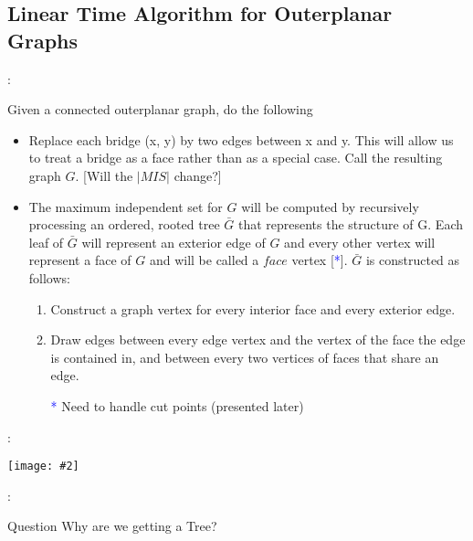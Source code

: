 \documentclass{beamer}
\newcommand{\iph}[2]{
    \texttt{[image: \#2]}
}
\begin{document}
\subsection{Linear Time Algorithm for Outerplanar Graphs}
\begin{frame}{\secname : \subsecname}
    \begin{block}{Given a connected outerplanar graph, do the following}
    \begin{itemize}
        \item Replace each bridge (x, y) by two
        edges between x and y. This will allow us to treat a bridge as a face rather
        than as a special case. Call the resulting graph $G$. [Will the $|MIS|$ change?]

        \item The maximum independent set for $G$ will be computed by recursively
processing an ordered, rooted tree $\bar{G}$ that represents the structure of G. Each
leaf of $\bar{G}$ will represent an exterior edge of $G$ and every other vertex will represent
a face of $G$ and will be called a $face$ vertex [\textcolor{blue}{*}]. $\bar{G}$ is constructed as follows:
        \begin{enumerate}
        \item Construct a graph vertex for every interior face and
        every exterior edge.

        \item Draw edges between every edge vertex and the vertex of the face the edge is contained in, and between
        every two vertices of faces that share an edge.

        \item[\textcolor{blue}{*}] Need to handle cut points (presented later)      
        \end{enumerate}
    \end{itemize}
    \end{block}

\end{frame}



\begin{frame}{\secname : \subsecname}
        \iph{0.9}{lin1}

\end{frame}

\begin{frame}{\secname : \subsecname}
    \begin{block}{Question}
        Why are we getting a Tree? 
    \end{block}

\end{frame}
\end{document}
